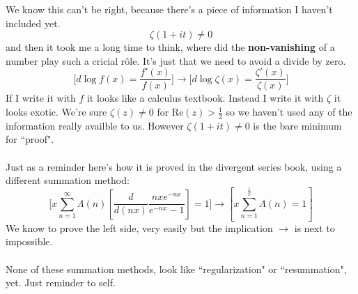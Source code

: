 \documentclass[12pt]{article}
\begin{document}
\newpage
We know this can't be right, because there's a piece of information I haven't included yet. 
$$ \zeta( 1 + it) \neq 0 $$
and then it took me a long time to think, where did the \textbf{non-vanishing} of a number play such a cricial r\^{o}le.  It's just that we need to avoid a divide by zero.
$$ \bigg[ d\log f(x) = \frac{f'(x)}{f(x)} \bigg] \to \bigg[ d \log \zeta(x) = \frac{\zeta'(x)}{\zeta(x)}\bigg]  $$
If I write it with $f$ it looks like a calculus textbook.  Instead I write it with $\zeta$ it looks exotic.  We're sure $\zeta(z) \neq 0$ for $\mathrm{Re}(z) > \frac{1}{2}$ so we haven't used any of the information really availble to us.  However  $\zeta(1 + it) \neq 0$ is the bare minimum for ``proof". \\ \\
Just as a reminder here's how it is proved in the divergent series book, using a different summation method:
$$ \Bigg[ x\sum_{n=1}^\infty \Lambda(n) \left[ \frac{d}{d(nx)} \frac{nx e^{-nx}}{e^{-nx} - 1} \right] = 1 \Bigg] \to \left[ x \sum_{n=1}^{\frac{1}{x}} \Lambda(n) = 1 \right] $$
We know to prove the left side, very easily but the implication $\to$ is next to impossible. \\ \\
None of these summation methods, look like ``regularization" or ``resummation", yet.  Just reminder to self.

\newpage
\end{document}
